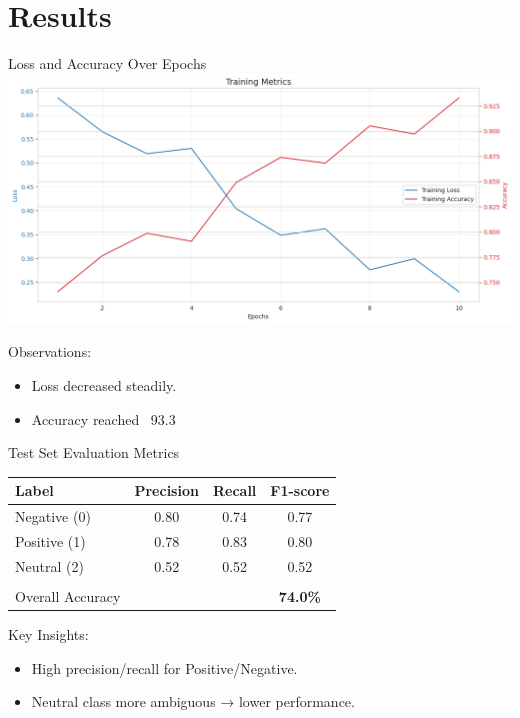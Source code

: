 \documentclass[aspectratio=169]{beamer}
\begin{document}
\section{Results}
\begin{frame}{Loss and Accuracy Over Epochs}
  \centering
  \includegraphics[width=0.45\linewidth]{training_metrics.png}

  Observations:
  \begin{itemize}
    \item Loss decreased steadily.
    \item Accuracy reached ~93.3%
  \end{itemize}
\end{frame}

\begin{frame}{Test Set Evaluation Metrics}
  \vspace{-0.5em}
  {\small
    \begin{tabular}{lccc}
      Label            & Precision & Recall & F1-score     \\
      \hline
      Negative (0)     & 0.80      & 0.74   & 0.77         \\
      Positive (1)     & 0.78      & 0.83   & 0.80         \\
      Neutral (2)      & 0.52      & 0.52   & 0.52         \\
      \\[-0.8em]
      Overall Accuracy &           &        & {\bf 74.0\%} \\
    \end{tabular}}

  \vspace{1em}

  Key Insights:
  \begin{itemize}
    \item High precision/recall for Positive/Negative.
    \item Neutral class more ambiguous → lower performance.
  \end{itemize}
\end{frame}
\end{document}
